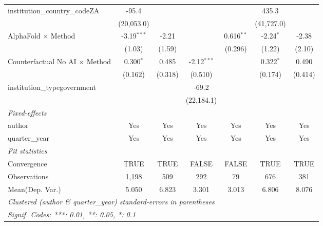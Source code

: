 \begin{tabular}{lcccccc}
   institution\_country\_codeZA          & -95.4         &              &               &                & 435.3         &   \\   
                                         & (20,053.0)    &              &               &                & (41,727.0)    &   \\   
   AlphaFold $\times$ Method             & -3.19$^{***}$ & -2.21        &               & 0.616$^{**}$   & -2.24$^{*}$   & -2.38\\   
                                         & (1.03)        & (1.59)       &               & (0.296)        & (1.22)        & (2.10)\\   
   Counterfactual No AI $\times$ Method  & 0.300$^{*}$   & 0.485        & -2.12$^{***}$ &                & 0.322$^{*}$   & 0.490\\   
                                         & (0.162)       & (0.318)      & (0.510)       &                & (0.174)       & (0.414)\\   
   institution\_typegovernment           &               &              & -69.2         &                &               &   \\   
                                         &               &              & (22,184.1)    &                &               &   \\   
   \midrule
   \emph{Fixed-effects}\\
   author                                & Yes           & Yes          & Yes           & Yes            & Yes           & Yes\\  
   quarter\_year                         & Yes           & Yes          & Yes           & Yes            & Yes           & Yes\\  
   \midrule
   \emph{Fit statistics}\\
   Convergence                           &TRUE           & TRUE         & FALSE         & FALSE          & TRUE          & TRUE\\  
   Observations                          & 1,198         & 509          & 292           & 79             & 676           & 381\\  
Mean(Dep. Var.) & 5.050 & 6.823 & 3.301 & 3.013 & 6.806 & 8.076 \\
   \midrule \midrule
   \multicolumn{7}{l}{\emph{Clustered (author \& quarter\_year) standard-errors in parentheses}}\\
   \multicolumn{7}{l}{\emph{Signif. Codes: ***: 0.01, **: 0.05, *: 0.1}}\\
\end{tabular}
\par\endgroup
